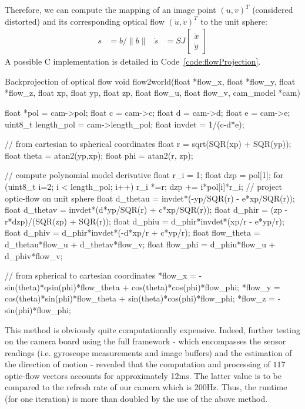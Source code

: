 Therefore, we can compute the mapping of an image point $(u,v)^T$ (considered distorted) and its corresponding optical flow $(\dot{u}, \dot{v})^T$ to the unit sphere:
\begin{align}
s &= b/\|b\| & \dot{s} &= SJ \begin{bmatrix} \dot{x} \\ \dot{y} \end{bmatrix}
\end{align}
A possible C implementation is detailed in Code~\ref{code:flowProjection}.

\begin{center}
\begin{code}[colback=white, label=code:flowProjection]{Backprojection of optical flow}
void flow2world(float *flow_x, float *flow_y, float *flow_z, 
		float xp, float yp, float zp, float flow_u, 
		float flow_v, cam_model *cam)
{
	 float *pol    = cam->pol;
	 float c       = cam->c;
	 float d       = cam->d;
	 float e       = cam->e;
	 uint8_t length_pol = cam->length_pol;
	 float invdet  = 1/(c-d*e); 
	 
	 // from cartesian to spherical coordinates
	 float r   = sqrt(SQR(xp) + SQR(yp));
	 float theta = atan2(yp,xp);
	 float phi = atan2(r, zp); 
	 
	 // compute polynomial model derivative
	 float r_i = 1;
	 float dzp = pol[1];
	 for (uint8_t i=2; i < length_pol; i++)
	 {
	   r_i *=r;
	   dzp += i*pol[i]*r_i;
	 }
	 // project optic-flow on unit sphere
	 float d_thetau = invdet*(-yp/SQR(r) - e*xp/SQR(r));
	 float d_thetav = invdet*(d*yp/SQR(r) + c*xp/SQR(r));
	 float d_phir = (zp - r*dzp)/(SQR(zp) + SQR(r));
	 float d_phiu = d_phir*invdet*(xp/r - e*yp/r);
	 float d_phiv = d_phir*invdet*(-d*xp/r + c*yp/r);
	 float flow_theta = d_thetau*flow_u 
	 		   + d_thetav*flow_v;
	 float flow_phi = d_phiu*flow_u + d_phiv*flow_v;
	 
	 // from spherical to cartesian coordinates
	 *flow_x = -sin(theta)*qsin(phi)*flow_theta 
	 	   + cos(theta)*cos(phi)*flow_phi;
	 *flow_y = cos(theta)*sin(phi)*flow_theta 
	 	   + sin(theta)*cos(phi)*flow_phi;
	 *flow_z = -sin(phi)*flow_phi;
}
\end{code}
\end{center}

This method is obviously quite computationally expensive. Indeed, further testing on the camera board using the full framework - which encompasses the sensor readings (i.e. gyroscope measurements and image buffers) and the estimation of the direction of motion - revealed that the computation and processing of $117$ optic-flow vectors accounts for approximately 12ms. The latter value is to be compared to the refresh rate of our camera which is 200Hz. Thus, the runtime (for one iteration) is more than doubled by the use of the above method. 

